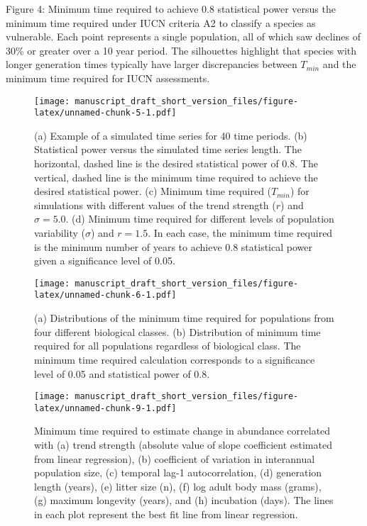 \documentclass[12pt,]{article}
\begin{document}
Figure 4: Minimum time required to achieve 0.8 statistical power versus
the minimum time required under IUCN criteria A2 to classify a species
as vulnerable. Each point represents a single population, all of which
saw declines of 30\% or greater over a 10 year period. The silhouettes
highlight that species with longer generation times typically have
larger discrepancies between \(T_{min}\) and the minimum time required
for IUCN assessments.

\pagebreak

\begin{figure}
\centering
\texttt{[image: manuscript\_draft\_short\_version\_files/figure-latex/unnamed-chunk-5-1.pdf]}
\caption{(a) Example of a simulated time series for 40 time periods. (b)
Statistical power versus the simulated time series length. The
horizontal, dashed line is the desired statistical power of 0.8. The
vertical, dashed line is the minimum time required to achieve the
desired statistical power. (c) Minimum time required (\(T_{min}\)) for
simulations with different values of the trend strength (\(r\)) and
\(\sigma = 5.0\). (d) Minimum time required for different levels of
population variability (\(\sigma\)) and \(r=1.5\). In each case, the
minimum time required is the minimum number of years to achieve 0.8
statistical power given a significance level of
0.05.\label{fig:theoretical_approach}}
\end{figure}

\pagebreak

\begin{figure}
\centering
\texttt{[image: manuscript\_draft\_short\_version\_files/figure-latex/unnamed-chunk-6-1.pdf]}
\caption{(a) Distributions of the minimum time required for populations
from four different biological classes. (b) Distribution of minimum time
required for all populations regardless of biological class. The minimum
time required calculation corresponds to a significance level of 0.05
and statistical power of 0.8.\label{fig:min_time_dist}}
\end{figure}

\clearpage

\begin{figure}
\centering
\texttt{[image: manuscript\_draft\_short\_version\_files/figure-latex/unnamed-chunk-9-1.pdf]}
\caption{Minimum time required to estimate change in abundance
correlated with (a) trend strength (absolute value of slope coefficient
estimated from linear regression), (b) coefficient of variation in
interannual population size, (c) temporal lag-1 autocorrelation, (d)
generation length (years), (e) litter size (n), (f) log adult body mass
(grams), (g) maximum longevity (years), and (h) incubation (days). The
lines in each plot represent the best fit line from linear
regression.\label{fig:correlates}}
\end{figure}
\end{document}
